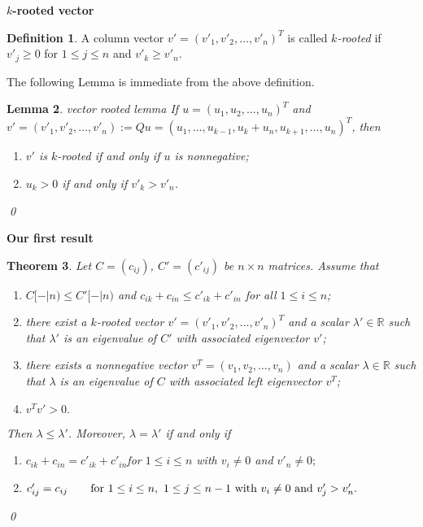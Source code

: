 \documentclass{beamer}
\theoremstyle{plain}
\newtheorem{thm}{Theorem}[section]
\newtheorem{lem}[thm]{Lemma}
\theoremstyle{definition}
\newtheorem{defn}[thm]{Definition}
\begin{document}
\begin{frame}{\bf $k$-rooted vector}

\begin{defn}
 A column vector $v'=(v'_1,v'_2,\ldots,v'_n)^T$ is called {\it $k$-rooted}  if $v'_{j} \geq 0$ for $1 \leq  j \leq n$ and $v'_k\geq v'_n.$
\end{defn}
\bigskip

The following Lemma is immediate from the above definition.
\bigskip

\begin{lem}{vector rooted lemma}
If $u=(u_1, u_2, \ldots, u_n)^T$ and $v'=(v'_1, v'_2, \ldots, v'_n):=Qu=(u_1,\ldots, u_{k-1},u_k+u_n, u_{k+1}, \ldots,  u_n)^T$, then
\begin{enumerate}
\item[(i)] $v'$ is $k$-rooted  if and only if  $u$ is nonnegative;
\item[(ii)] $u_k>0$ if and only if $v'_k>v'_n$.
\end{enumerate}
\qed
\end{lem}

\end{frame}

\begin{frame}{\bf Our first result}

\begin{thm}
    Let $C=(c_{ij})$, $C'=(c'_{ij})$ be  $n\times n$ matrices.
Assume that
\begin{enumerate}
\item[(i)]   $C[-|n)\leq C'[-|n)$ and $c_{ik}+c_{in}\leq c'_{ik}+c'_{in}$ for all $1\leq i\leq n$;
\item[(ii)] there exist a $k$-rooted vector $v'=(v'_1, v'_2, \ldots, v'_n)^T$ and a scalar $\lambda'\in \mathbb{R}$
such that $\lambda'$ is an eigenvalue of $C'$ with associated eigenvector $v'$;
\item[(iii)] there exists a nonnegative vector $v^T=(v_1, v_2, \ldots, v_n)$ and a scalar $\lambda\in \mathbb{R}$ such that $\lambda$ is an eigenvalue of $C$ with associated left eigenvector $v^T$;
\item[(iv)] $v^Tv'>0.$
\end{enumerate}
 Then $\lambda\leq \lambda'$.
Moreover, $\lambda=\lambda'$
if and only if
\begin{enumerate}
\item[(a)] $c_{ik}+c_{in}=c'_{ik}+c'_{in}$\qquad for $1\leq i\leq n$ with $v_i\not=0$ and $v'_n\not=0;$
\item[(b)]
$c'_{ij}=c_{ij}\qquad \hbox{for~}1\leq i\leq n,~1\leq j\leq n-1 \hbox{~with~} v_i\ne 0 \hbox{~and~} v'_j> v'_n.$
\end{enumerate} \qed
\end{thm}
\end{frame}
\end{document}
